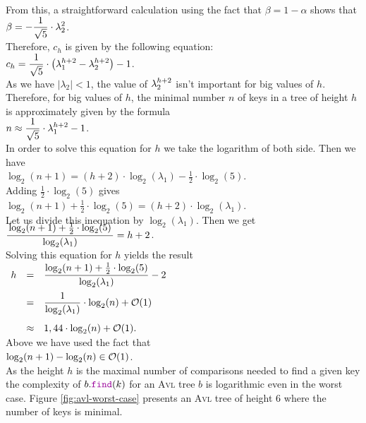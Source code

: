 From this, a straightforward calculation using the fact that $\beta = 1 - \alpha$ shows that 
\\[0.2cm]
\hspace*{1.3cm}
$\displaystyle \beta  = -\frac{1}{\sqrt{5}} \cdot \lambda_2^2$.
\\[0.2cm]
Therefore, $c_h$ is given by the following equation:
\\[0.2cm]
\hspace*{1.3cm}
$c_h = \displaystyle \frac{1}{\sqrt{5}} \cdot \left( \lambda_1^{h+2} - \lambda_2^{h+2} \right) -1$.  
\\[0.2cm]
As we have  $|\lambda_2| < 1$, the value of  $\displaystyle\lambda_2^{h+2}$ isn't important for big
values of $h$.  Therefore, for big values of $h$, the minimal number  $n$ of keys in a tree of
height  $h$ is approximately given by the formula \\[0.2cm]
\hspace*{1.3cm} $n \approx \displaystyle \frac{1}{\sqrt{5}} \cdot \lambda_1^{h+2} - 1$. \\[0.2cm]
In order to solve this equation for  $h$ we take the logarithm of both side.  Then we have
\\[0.2cm]
\hspace*{1.3cm}
$\log_2(n+1) = (h+2) \cdot \log_2(\lambda_1) - \frac{1}{2}\cdot \log_2(5)$.
\\[0.2cm]
Adding  $\frac{1}{2}\cdot \log_2(5)$ gives
\\[0.2cm]
\hspace*{1.3cm}
$\log_2(n+1) + \frac{1}{2}\cdot \log_2(5) = (h+2) \cdot \log_2(\lambda_1)$.
\\[0.2cm]
Let us divide this inequation by  $\log_2(\lambda_1)$.  Then we get
\\[0.4cm]
\hspace*{1.3cm}
$\ds \bruch{\log_2(n+1) + \frac{1}{2}\cdot \log_2(5)}{\log_2(\lambda_1)} = h+2$.
\\[0.2cm]
Solving this equation for  $h$ yields the result 
\\[0.4cm]
\hspace*{1.3cm} 
$
\begin{array}[t]{lcl}
h & = & \displaystyle \frac{\log_2(n+1) + \frac{1}{2}\cdot \log_2(5)}{\log_2(\lambda_1)} - 2 \\[0.4cm]
  & = & \displaystyle \frac{1}{\log_2(\lambda_1)}\cdot \log_2(n) + \mathcal{O}(1) \\[0.5cm]
  & \approx & 1,44 \cdot \log_2(n) + \mathcal{O}(1).
\end{array} 
$
\\[0.2cm]
Above we have used the fact that 
\\[0.2cm]
\hspace*{1.3cm}
$\log_2(n+1) - \log_2(n) \in \mathcal{O}(1)$. 
\\[0.2cm]
As the height $h$ is the maximal number of comparisons needed to find a given key
the complexity of $b.\mytt{find}(k)$ for an \textsc{Avl} tree $b$ is logarithmic even in the worst case.
Figure 
\ref{fig:avl-worst-case} presents an  \textsc{Avl} tree of height 6 where the number of keys is minimal.



